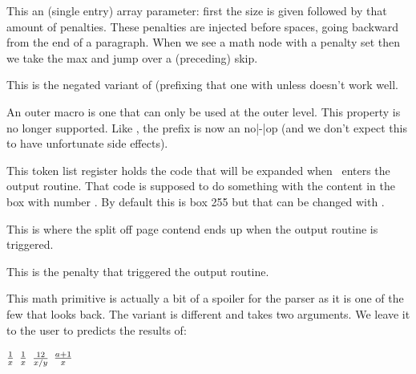 \stopnewprimitive

\startnewprimitive[title={\prm {orphanpenalties}}]

This an (single entry) array parameter: first the size is given followed by that
amount of penalties. These penalties are injected before spaces, going backward
from the end of a paragraph. When we see a math node with a penalty set then we
take the max and jump over a (preceding) skip.

\stopnewprimitive

\startnewprimitive[title={\prm {orunless}}]

This is the negated variant of  (prefixing that one with \tex
{unless} doesn't work well.

\stopnewprimitive

\startoldprimitive[title={\prm {outer}}][obsolete=yes]

An outer macro is one that can only be used at the outer level. This property is
no longer supported. Like , the  prefix is now an
no|-|op (and we don't expect this to have unfortunate side effects).

\stopoldprimitive

\startoldprimitive[title={\prm {output}}]

This token list register holds the code that will be expanded when \TEX\ enters
the output routine. That code is supposed to do something with the content in
the box with number . By default this is box 255 but that can be
changed with .

\stopoldprimitive

\startnewprimitive[title={\prm {outputbox}}]

This is where the split off page contend ends up when the output routine is
triggered.

\stopnewprimitive

\startoldprimitive[title={\prm {outputpenalty}}]

This is the penalty that triggered the output routine.

\stopoldprimitive

\startoldprimitive[title={\prm {over}}][obsolete=yes]

This math primitive is actually a bit of a spoiler for the parser as it is one of
the few that looks back. The  variant is different and takes two
arguments. We leave it to the user to predicts the results of:

\starttyping
$    {1} \over {x}    $
$     1  \over  x     $
$    12  \over  x / y $
$ a + 1  \over {x}    $
\stoptyping

